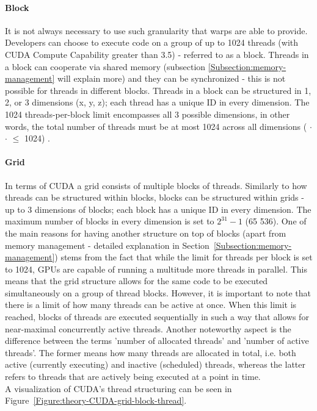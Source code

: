 \paragraph{Block}\label{Paragraph:theory-CUDA-thread-management-block}
It is not always necessary to use such granularity that warps are able to provide. Developers can choose to execute code on a group of up to 1024 threads (with CUDA Compute Capability greater than 3.5) - referred to as a block. Threads in a block can cooperate via shared memory (subsection \ref{Subsection:memory-management} will explain more) and they can be synchronized - this is not possible for threads in different blocks. Threads in a block can be structured in 1, 2, or 3 dimensions (x, y, z); each thread has a unique ID in every dimension. The 1024 threads-per-block limit encompasses all 3 possible dimensions, in other words, the total number of threads must be at most 1024 across all dimensions ( $ \cdot $  $ \cdot $  $ \leq$ 1024) \cite{AbiChahla18June2008, NVIDIAMay2022}.

\paragraph{Grid}\label{Paragraph:theory-CUDA-thread-management-grid}
In terms of CUDA a grid consists of multiple blocks of threads. Similarly to how threads can be structured within blocks, blocks can be structured within grids - up to 3 dimensions of blocks; each block has a unique ID in every dimension. The maximum number of blocks in every dimension is set to $ 2^{31} - 1 $ (65 536). One of the main reasons for having another structure on top of blocks (apart from memory management - detailed explanation in Section~\ref{Subsection:memory-management}) stems from the fact that while the limit for threads per block is set to 1024, GPUs are capable of running a multitude more threads in parallel. This means that the grid structure allows for the same code to be executed simultaneously on a group of thread blocks. However, it is important to note that there is a limit of how many threads can be active at once. When this limit is reached, blocks of threads are executed sequentially in such a way that allows for near-maximal concurrently active threads. Another noteworthy aspect is the difference between the terms 'number of allocated threads' and 'number of active threads'. The former means how many threads are allocated in total, i.e. both active (currently executing) and inactive (scheduled) threads, whereas the latter refers to threads that are actively being executed at a point in time. \\
A visualization of CUDA's thread structuring can be seen in Figure~\ref{Figure:theory-CUDA-grid-block-thread}.

